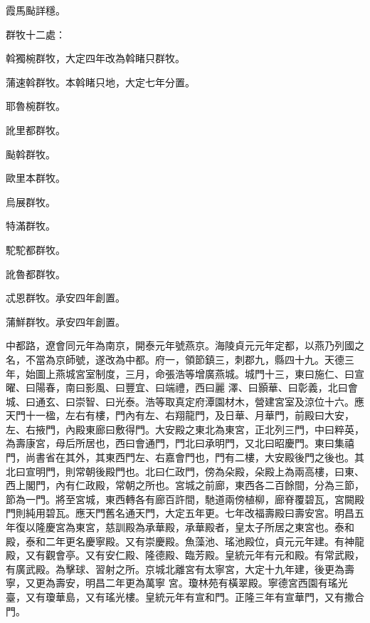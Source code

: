 \begin{pinyinscope}
 霞馬颭詳穩。



 群牧十二處：



 斡獨椀群牧，大定四年改為斡睹只群牧。



 蒲速斡群牧。本斡睹只地，大定七年分置。



 耶魯椀群牧。



 訛里都群牧。



 颭斡群牧。



 歐里本群牧。



 烏展群牧。



 特滿群牧。



 駝駝都群牧。



 訛魯都群牧。



 忒恩群牧。承安四年創置。



 蒲鮮群牧。承安四年創置。



 中都路，遼會同元年為南京，開泰元年號燕京。海陵貞元元年定都，以燕乃列國之名，不當為京師號，遂改為中都。府一，領節鎮三，刺郡九，縣四十九。天德三年，始圖上燕城宮室制度，三月，命張浩等增廣燕城。城門十三，東曰施仁、曰宣曜、曰陽春，南曰影風、曰豐宜、曰端禮，西曰麗
 澤、曰顥華、曰彰義，北曰會城、曰通玄、曰崇智、曰光泰。浩等取真定府潭園材木，營建宮室及涼位十六。應天門十一楹，左右有樓，門內有左、右翔龍門，及日華、月華門，前殿曰大安，左、右掖門，內殿東廊曰敷得門。大安殿之東北為東宮，正北列三門，中曰粹英，為壽康宮，母后所居也，西曰會通門，門北曰承明門，又北曰昭慶門。東曰集禧門，尚書省在其外，其東西門左、右嘉會門也，門有二樓，大安殿後門之後也。其北曰宣明門，則常朝後殿門也。北曰仁政門，傍為朵殿，朵殿上為兩高樓，曰東、西上閣門，內有仁政殿，常朝之所也。宮城之前廊，東西各二百餘間，分為三節，節為一門。將至宮城，東西轉各有廊百許間，馳道兩傍植柳，廊脊覆碧瓦，宮闕殿門則純用碧瓦。應天門舊名通天門，大定五年更。七年改福壽殿曰壽安宮。明昌五年復以隆慶宮為東宮，慈訓殿為承華殿，承華殿者，皇太子所居之東宮也。泰和殿，泰和二年更名慶寧殿。又有崇慶殿。魚藻池、瑤池殿位，貞元元年建。有神龍殿，又有觀會亭。又有安仁殿、隆德殿、臨芳殿。皇統元年有元和殿。有常武殿，有廣武殿。為擊球、習射之所。京城北離宮有太寧宮，大定十九年建，後更為壽寧，又更為壽安，明昌二年更為萬寧
 宮。瓊林苑有橫翠殿。寧德宮西園有瑤光臺，又有瓊華島，又有瑤光樓。皇統元年有宣和門。正隆三年有宣華門，又有撒合門。




\end{pinyinscope}
